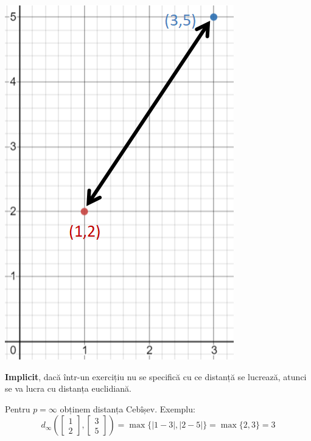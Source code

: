 \documentclass[12pt]{article}
\begin{document}
	\begin{center}
		\includegraphics{screenshot002}
	\end{center}
	
	
	\textbf{Implicit}, dacă într-un exercițiu nu se specifică cu ce distanță se lucrează, atunci se va lucra cu distanța euclidiană.
	
	
	Pentru $p=\infty$ obținem distanța Cebîșev. Exemplu:
	$$d_\infty \left( \begin{bmatrix}
	1\\
	2
	\end{bmatrix}, \begin{bmatrix}
	3\\
	5
	\end{bmatrix} \right) = \max \{|1-3|,|2-5|\} = \max \{2,3\} = 3$$
	
\end{document}
